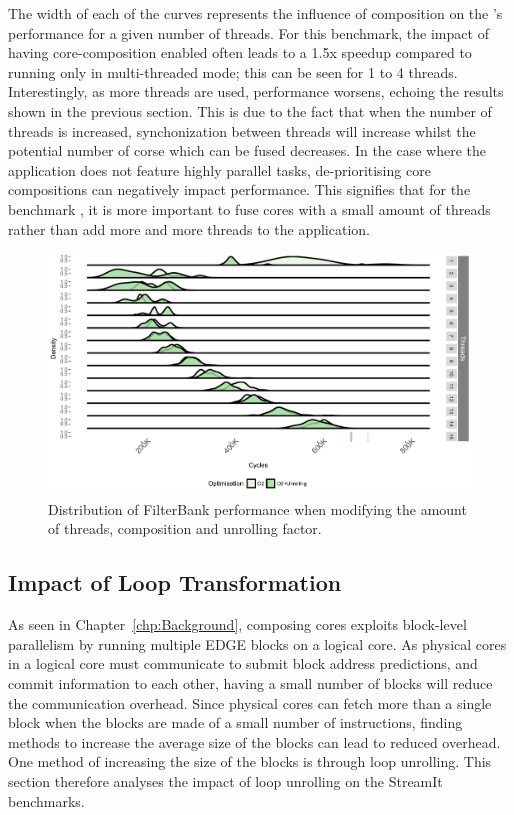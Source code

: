 The width of each of the curves represents the influence of composition on the 's performance for a given number of threads.
For this benchmark, the impact of having core-composition enabled often leads to a 1.5x speedup compared to running only in multi-threaded mode; this can be seen for 1 to 4 threads.
Interestingly, as more threads are used, performance worsens, echoing the results shown in the previous section.
This is due to the fact that when the number of threads is increased, synchonization between threads will increase whilst the potential number of corse which can be fused decreases.
In the case where the application does not feature highly parallel tasks, de-prioritising core compositions can negatively impact performance.
This signifies that for the benchmark , it is more important to fuse cores with a small amount of threads rather than add more and more threads to the application.


\begin{figure}[t]
  \includegraphics[width=1\textwidth]{streamit-paper/graphics/filterbank_unroll.pdf}
  \caption{Distribution of FilterBank performance when modifying the amount of threads, composition and unrolling factor.}\label{fig:fbunroll}
\end{figure}


\subsection{Impact of Loop Transformation}
As seen in Chapter~\ref{chp:Background}, composing cores exploits block-level parallelism by running multiple EDGE blocks on a logical core.
As physical cores in a logical core must communicate to submit block address predictions, and commit information to each other, having a small number of blocks will reduce the communication overhead.
Since physical cores can fetch more than a single block when the blocks are made of a small number of instructions, finding methods to increase the average size of the blocks can lead to reduced overhead.
One method of increasing the size of the blocks is through loop unrolling.
This section therefore analyses the impact of loop unrolling on the StreamIt benchmarks.

